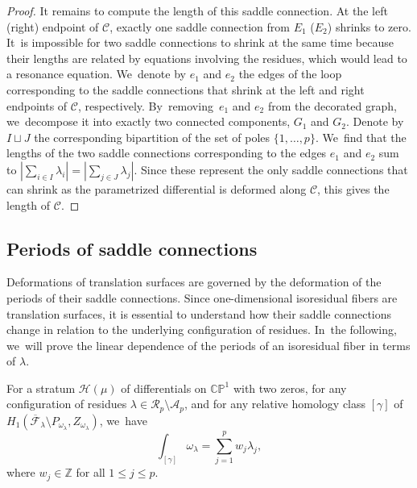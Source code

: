 \begin{proof}
It remains to compute the length of this saddle connection. At the left (\resp right) endpoint of $\mathcal{C}$, exactly one saddle connection from $E_{1}$ (\resp $E_{2}$) shrinks to zero. It~is impossible for two saddle connections to shrink at the same time because their lengths are related by equations involving the residues, which would lead to a resonance equation. We~denote by $e_{1}$ and $e_{2}$ the edges of the loop corresponding to the saddle connections that shrink at the left and right endpoints of $\mathcal{C}$, respectively. By~removing~$e_{1}$ and $e_{2}$ from the decorated graph, we~decompose it into exactly two connected components, $G_{1}$ and $G_{2}$. Denote by $I \sqcup J$ the corresponding bipartition of the set of poles $\lbrace{ 1,\dots,p \rbrace}$. We~find that the lengths of the two saddle connections corresponding to the edges $e_{1}$ and $e_{2}$ sum to $|\sum_{i \in I} \lambda_{i}|=|\sum_{j \in J} \lambda_{j}|$. Since these represent the only saddle connections that can shrink as the parametrized differential is deformed along $\mathcal{C}$, this gives the length of $\mathcal{C}$.
\end{proof}

\subsection{Periods of saddle connections}

Deformations of translation surfaces are governed by the deformation of the periods of their saddle connections. Since one-dimensional isoresidual fibers are translation surfaces, it is essential to understand how their saddle connections change in relation to the underlying configuration of residues. In~the following, we~will prove the linear dependence of the periods of an isoresidual fiber in terms of $\lambda$.

\begin{prop}\label{prop:IntegerWeights}
For a stratum $\mathcal{H}(\mu)$ of differentials on $\mathbb{C}\mathbb{P}^1$ with two zeros, for any configuration of residues $\lambda \in \mathcal{R}_{p} \setminus \mathcal{A}_{p}$, and for any relative homology class $[\gamma]$ of $H_{1}(\overline{\mathcal{F}}_{\lambda} \setminus P_{\omega_{\lambda}}, Z_{\omega_{\lambda}})$, we~have\vspace*{-5pt}
\[
\int_{[\gamma]} \omega_{\lambda} = \sum_{j=1}^{p} w_{j}\lambda_{j},
\]
where $w_{j} \in \mathbb{Z}$ for all $1 \leq j \leq p$.
\end{prop}

